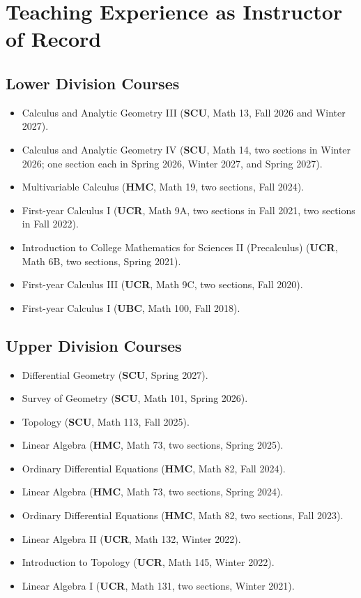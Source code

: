 \documentclass[11pt]{article}
\begin{document}
\section{Teaching Experience as Instructor of Record}

\subsection*{Lower Division Courses}
\begin{itemize}
  \item Calculus and Analytic Geometry III (\textbf{SCU}, Math 13, Fall 2026 and Winter 2027).
  \item Calculus and Analytic Geometry IV (\textbf{SCU}, Math 14, two sections in Winter 2026; one section each in Spring 2026, Winter 2027, and Spring 2027).
  \item Multivariable Calculus (\textbf{HMC}, Math 19, two sections, Fall 2024).
  \item First-year Calculus I (\textbf{UCR}, Math 9A, two sections in Fall 2021, two sections in Fall 2022).
  \item Introduction to College Mathematics for Sciences II (Precalculus) (\textbf{UCR}, Math 6B, two sections, Spring 2021).
  \item First-year Calculus III (\textbf{UCR}, Math 9C, two sections, Fall 2020).
  \item First-year Calculus I (\textbf{UBC}, Math 100, Fall 2018).
\end{itemize}

\subsection*{Upper Division Courses}
\begin{itemize}
  \item Differential Geometry (\textbf{SCU}, Spring 2027).
  \item Survey of Geometry (\textbf{SCU}, Math 101, Spring 2026).
  \item Topology (\textbf{SCU}, Math 113, Fall 2025).
  \item Linear Algebra (\textbf{HMC}, Math 73, two sections, Spring 2025).
  \item Ordinary Differential Equations (\textbf{HMC}, Math 82, Fall 2024).
  \item Linear Algebra (\textbf{HMC}, Math 73, two sections, Spring 2024).
  \item Ordinary Differential Equations (\textbf{HMC}, Math 82, two sections, Fall 2023).
  \item Linear Algebra II (\textbf{UCR}, Math 132, Winter 2022).
  \item Introduction to Topology (\textbf{UCR}, Math 145, Winter 2022).
  \item Linear Algebra I (\textbf{UCR}, Math 131, two sections, Winter 2021).
\end{itemize}
\end{document}
